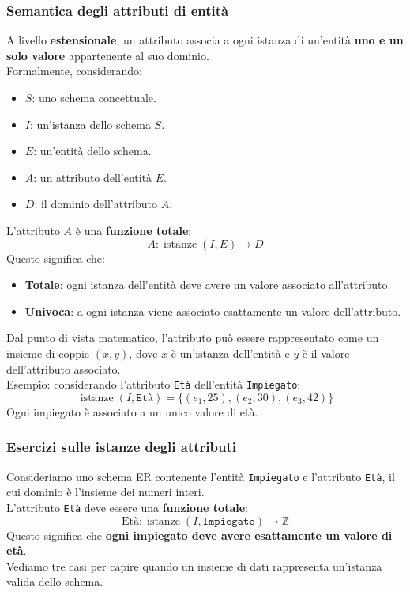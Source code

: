 \subsubsection{Semantica degli attributi di entità}

A livello \textbf{estensionale}, un attributo associa a ogni istanza di un'entità \textbf{uno e un solo valore} appartenente al suo dominio.\\
Formalmente, considerando:
\begin{itemize}
    \item $S$: uno schema concettuale.
    \item $I$: un'istanza dello schema $S$.
    \item $E$: un'entità dello schema.
    \item $A$: un attributo dell'entità $E$.
    \item $D$: il dominio dell'attributo $A$.
\end{itemize}
\noindent L'attributo $A$ è una \textbf{funzione totale}:
\[
A : \operatorname{istanze}(I,E) \longrightarrow D
\]
Questo significa che:
\begin{itemize}
    \item \textbf{Totale}: ogni istanza dell'entità deve avere un valore associato all'attributo.
    \item \textbf{Univoca}: a ogni istanza viene associato esattamente un valore dell'attributo.
\end{itemize}
\noindent Dal punto di vista matematico, l'attributo può essere rappresentato come un insieme di coppie $(x,y)$, dove $x$ è un'istanza dell'entità e $y$ è il valore dell'attributo associato.\medskip\\
\textcolor{verdeEsempio}{Esempio}: considerando l'attributo \texttt{Età} dell'entità \texttt{Impiegato}:
\[
\operatorname{istanze}(I,\texttt{Età}) =
\{(e_1,25),(e_2,30),(e_3,42)\}
\]
Ogni impiegato è associato a un unico valore di età.
\subsubsection{Esercizi sulle istanze degli attributi}

Consideriamo uno schema ER contenente l'entità \texttt{Impiegato} e l'attributo \texttt{Età}, il cui dominio è l'insieme dei numeri interi.\\
L'attributo \texttt{Età} deve essere una \textbf{funzione totale}:
\[
\text{Età}: \operatorname{istanze}(I,\texttt{Impiegato})
\longrightarrow \mathbb{Z}
\]
Questo significa che \textbf{ogni impiegato deve avere esattamente un valore di età}.\\
Vediamo tre casi per capire quando un insieme di dati rappresenta un'istanza valida dello schema.

